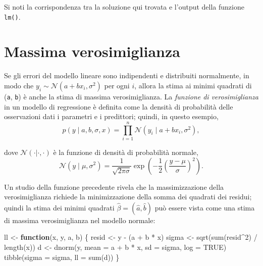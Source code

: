 \documentclass[
  10pt,
  italian,
  a4paper,
  extrafontsizes,onecolumn,openright
  ]{memoir}
\newenvironment{Shaded}{\begin{snugshade}}{\end{snugshade}}
\newcommand{\AttributeTok}[1]{\textcolor[rgb]{0.77,0.63,0.00}{#1}}
\newcommand{\ConstantTok}[1]{\textcolor[rgb]{0.00,0.00,0.00}{#1}}
\newcommand{\ControlFlowTok}[1]{\textcolor[rgb]{0.13,0.29,0.53}{\textbf{#1}}}
\newcommand{\DecValTok}[1]{\textcolor[rgb]{0.00,0.00,0.81}{#1}}
\newcommand{\FunctionTok}[1]{\textcolor[rgb]{0.00,0.00,0.00}{#1}}
\newcommand{\NormalTok}[1]{#1}
\newcommand{\OtherTok}[1]{\textcolor[rgb]{0.56,0.35,0.01}{#1}}
\newcommand{\SpecialCharTok}[1]{\textcolor[rgb]{0.00,0.00,0.00}{#1}}
\begin{document}
Si noti la corrispondenza tra la soluzione qui trovata e l'output della funzione \texttt{lm()}.

\hypertarget{massima-verosimiglianza}{%
\section{Massima verosimiglianza}\label{massima-verosimiglianza}}

Se gli errori del modello lineare sono indipendenti e distribuiti normalmente, in modo che \(y_i \sim \mathcal{N}(a + b x_i, \sigma^2)\) per ogni \(i\), allora la stima ai minimi quadrati di (\texttt{a}, \texttt{b}) è anche la stima di massima verosimiglianza. La \emph{funzione di verosimiglianza} in un modello di regressione è definita come la densità di probabilità delle osservazioni dati i parametri e i predittori; quindi, in questo esempio,
\[
 p(y \mid a, b, \sigma, x) = \prod_{i=1}^n \mathcal{N}(y_i \mid a + b x_i, \sigma^2),
 \]

dove \(\mathcal{N}(\cdot | \cdot, \cdot)\) è la funzione di densità di probabilità normale,
\[
\mathcal{N}(y \mid \mu, \sigma^2) = \frac{1}{\sqrt{2 \pi \sigma}} \exp \left(-\frac{1}{2} \left( \frac{y - \mu}{\sigma} \right)^2 \right).
\]

Un studio della funzione precedente rivela che la massimizzazione della verosimiglianza richiede la minimizzazione della somma dei quadrati dei residui; quindi la stima dei minimi quadrati \(\hat{\beta} = (\hat{a}, \hat{b})\) può essere vista come una stima di massima verosimiglianza nel modello normale:

\begin{Shaded}
\begin{Highlighting}[]
\NormalTok{ll }\OtherTok{\textless{}{-}} \ControlFlowTok{function}\NormalTok{(x, y, a, b) \{}
\NormalTok{  resid }\OtherTok{\textless{}{-}}\NormalTok{ y }\SpecialCharTok{{-}}\NormalTok{ (a }\SpecialCharTok{+}\NormalTok{ b }\SpecialCharTok{*}\NormalTok{ x)}
\NormalTok{  sigma }\OtherTok{\textless{}{-}} \FunctionTok{sqrt}\NormalTok{(}\FunctionTok{sum}\NormalTok{(resid}\SpecialCharTok{\^{}}\DecValTok{2}\NormalTok{) }\SpecialCharTok{/} \FunctionTok{length}\NormalTok{(x))}
\NormalTok{  d }\OtherTok{\textless{}{-}} \FunctionTok{dnorm}\NormalTok{(y, }\AttributeTok{mean =}\NormalTok{ a }\SpecialCharTok{+}\NormalTok{ b }\SpecialCharTok{*}\NormalTok{ x, }\AttributeTok{sd =}\NormalTok{ sigma, }\AttributeTok{log =} \ConstantTok{TRUE}\NormalTok{)}
  \FunctionTok{tibble}\NormalTok{(}\AttributeTok{sigma =}\NormalTok{ sigma, }\AttributeTok{ll =} \FunctionTok{sum}\NormalTok{(d))}
\NormalTok{\}}
\end{Highlighting}
\end{Shaded}
\end{document}
